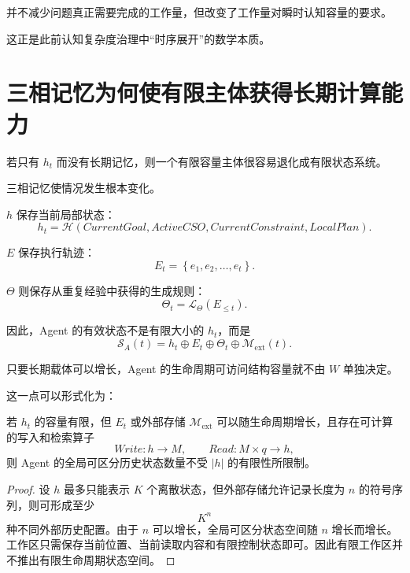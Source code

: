 并不减少问题真正需要完成的工作量，但改变了工作量对瞬时认知容量的要求。

这正是此前认知复杂度治理中“时序展开”的数学本质。

\section{三相记忆为何使有限主体获得长期计算能力}

若只有 $h_t$ 而没有长期记忆，则一个有限容量主体很容易退化成有限状态系统。

三相记忆使情况发生根本变化。

$h$ 保存当前局部状态：
\begin{equation}
h_t
=
\mathcal H(
CurrentGoal,
ActiveCSO,
CurrentConstraint,
LocalPlan
).
\end{equation}

$E$ 保存执行轨迹：
\begin{equation}
E_t
=
\left\{
e_1,e_2,\ldots,e_t
\right\}.
\end{equation}

$\Theta$ 则保存从重复经验中获得的生成规则：
\begin{equation}
\Theta_t
=
\mathcal L_\Theta(E_{\leq t}).
\end{equation}

因此，Agent 的有效状态不是有限大小的 $h_t$，而是
\begin{equation}
\boxed{
\mathcal S_A(t)
=
h_t
\oplus
E_t
\oplus
\Theta_t
\oplus
\mathcal M_{\mathrm{ext}}(t).
}
\end{equation}

只要长期载体可以增长，Agent 的生命周期可访问结构容量就不由 $W$ 单独决定。

这一点可以形式化为：

\begin{lemma}
若 $h_t$ 的容量有限，但 $E_t$ 或外部存储 $\mathcal M_{\mathrm{ext}}$ 可以随生命周期增长，且存在可计算的写入和检索算子
\begin{equation}
Write:
h\rightarrow M,
\qquad
Read:
M\times q\rightarrow h,
\end{equation}
则 Agent 的全局可区分历史状态数量不受 $|h|$ 的有限性所限制。
\end{lemma}

\begin{proof}
设 $h$ 最多只能表示 $K$ 个离散状态，但外部存储允许记录长度为 $n$ 的符号序列，则可形成至少
\begin{equation}
K^n
\end{equation}
种不同外部历史配置。由于 $n$ 可以增长，全局可区分状态空间随 $n$ 增长而增长。工作区只需保存当前位置、当前读取内容和有限控制状态即可。因此有限工作区并不推出有限生命周期状态空间。
\end{proof}

